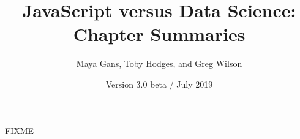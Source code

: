 \documentclass{article}
\begin{document}
\title{JavaScript versus Data Science: Chapter Summaries}
\author{Maya Gans, Toby Hodges, and Greg Wilson}
\date{Version 3.0 beta / July 2019}
\maketitle

FIXME
\end{document}
